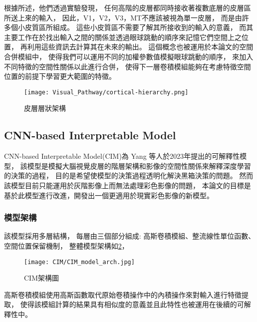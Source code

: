 \documentclass[class=NCU_thesis, crop=false]{standalone}
\begin{document}

\pagebreak
根據\cite{10.5555993636}所述，他們透過實驗發現，
任何高階的皮層都同時接收著複數底層的皮層區所送上來的輸入，
因此，V1，V2，V3，MT不應該被視為單一皮層，
而是由許多個小皮質區所組成。
這些小皮質區不需要了解其所接收到的輸入的意義，
而其主要工作在於找出輸入之間的關係並透過眼球跳動的順序來記憶它們空間上之位置，
再利用這些資訊去計算其在未來的輸出。
這個概念也被運用於本論文的空間合併模組中，
使得我們可以運用不同的加權參數值模擬眼球跳動的順序，
來加入不同特徵的空間性關係以此進行合併，
使得下一層卷積模組能夠在考慮特徵空間位置的前提下學習更大範圍的特徵。

\begin{figure}[H]
  \centering
  \texttt{[image: Visual\_Pathway/cortical-hierarchy.png]}
  \caption{皮層層狀架構~\cite{10.5555993636}}
  \label{fig:CorticalHierarchy}
\end{figure}
\pagebreak


\subsection{CNN-based Interpretable Model}
CNN-based Interpretable Model(CIM)\cite{YangCNNInterpretable}為 Yang 等人於2023年提出的可解釋性模型，
該模型是模擬大腦視覺皮層的階層架構和影像的空間性關係來解釋深度學習的決策的過程，
目的是希望使模型的決策過程透明化解決黑箱決策的問題。
然而該模型目前只能運用於灰階影像上而無法處理彩色影像的問題，
本論文的目標是基於此模型進行改進，開發出一個更適用於現實彩色影像的新模型。

\subsubsection{模型架構}
該模型採用多層結構，
每層由三個部分組成: 高斯卷積模組、整流線性單位函數、空間位置保留機制，
整體模型架構如\cref{fig:CIM_arch}，
\begin{figure}[H]
  \centering
  \texttt{[image: CIM/CIM\_model\_arch.jpg]}
  \caption{CIM架構圖~\cite{YangCNNInterpretable}}
  \label{fig:CIM_arch}
\end{figure}


高斯卷積模組使用高斯函數取代原始卷積操作中的內積操作來對輸入進行特徵提取，
使得該模組計算的結果具有相似度的意義並且此特性也被運用在後續的可解釋性中。\\
\end{document}
